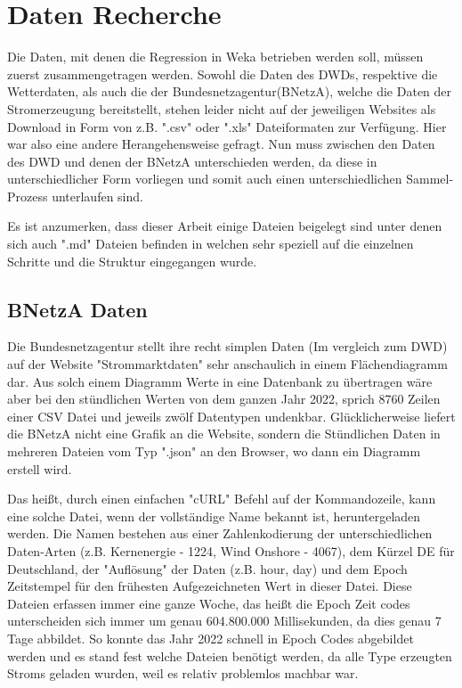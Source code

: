 \documentclass[letterpaper]{article} %
\begin{document}
\section*{Daten Recherche}
        Die Daten, mit denen die Regression in Weka betrieben werden soll, müssen zuerst zusammengetragen werden. Sowohl die Daten des DWDs, respektive die Wetterdaten, als auch die der Bundesnetzagentur(BNetzA), welche die Daten der Stromerzeugung bereitstellt, stehen leider nicht auf der jeweiligen Websites als Download in Form von z.B. ".csv" oder ".xls" Dateiformaten zur Verfügung. Hier war also eine andere Herangehensweise gefragt. Nun muss zwischen den Daten des DWD und denen der BNetzA unterschieden werden, da diese in unterschiedlicher Form vorliegen und somit auch einen unterschiedlichen Sammel-Prozess unterlaufen sind.

        Es ist anzumerken, dass dieser Arbeit einige Dateien beigelegt sind unter denen sich auch ".md" Dateien befinden in welchen sehr speziell auf die einzelnen Schritte und die Struktur eingegangen wurde.


        \subsection*{BNetzA Daten}
        Die Bundesnetzagentur stellt ihre recht simplen Daten (Im vergleich zum DWD) auf der Website "Strommarktdaten" sehr anschaulich in einem Flächendiagramm dar. Aus solch einem Diagramm Werte in eine Datenbank zu übertragen wäre aber bei den stündlichen Werten von dem ganzen Jahr 2022, sprich 8760 Zeilen einer CSV Datei und jeweils zwölf Datentypen undenkbar. Glücklicherweise liefert die BNetzA nicht eine Grafik an die Website, sondern die Stündlichen Daten in mehreren Dateien vom Typ ".json" an den Browser, wo dann ein Diagramm erstell wird.

        Das heißt, durch einen einfachen "cURL" Befehl auf der Kommandozeile, kann eine solche Datei, wenn der vollständige Name bekannt ist, heruntergeladen werden. Die Namen bestehen aus einer Zahlenkodierung der unterschiedlichen Daten-Arten (z.B. Kernenergie - 1224, Wind Onshore - 4067), dem Kürzel DE für Deutschland, der "Auflösung" der Daten (z.B. hour, day) und dem Epoch Zeitstempel für den frühesten Aufgezeichneten Wert in dieser Datei.
        Diese Dateien erfassen immer eine ganze Woche, das heißt die Epoch Zeit codes unterscheiden sich immer um genau 604.800.000 Millisekunden, da dies genau 7 Tage abbildet. So konnte das Jahr 2022 schnell in Epoch Codes abgebildet werden und es stand fest welche Dateien benötigt werden, da alle Type erzeugten Stroms geladen wurden, weil es relativ problemlos machbar war.
        
\end{document}
